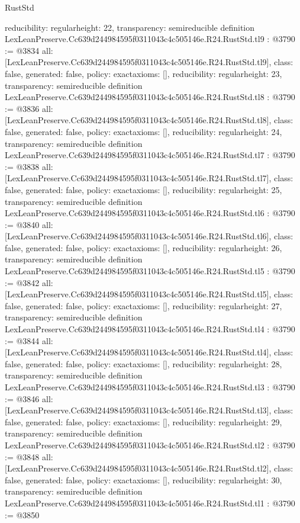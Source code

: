 \begin{lexlean}{RustStd}
\begin{coremodule}
{  reducibility: regular{height: 22},
  transparency: semireducible
}
definition LexLeanPreserve.Cc639d244984595f0311043c4c505146e.R24.RustStd.tl9 : @3790 := @3834 {
  all: [LexLeanPreserve.Cc639d244984595f0311043c4c505146e.R24.RustStd.tl9],
  class: false,
  generated: false,
  policy: exact{axioms: []},
  reducibility: regular{height: 23},
  transparency: semireducible
}
definition LexLeanPreserve.Cc639d244984595f0311043c4c505146e.R24.RustStd.tl8 : @3790 := @3836 {
  all: [LexLeanPreserve.Cc639d244984595f0311043c4c505146e.R24.RustStd.tl8],
  class: false,
  generated: false,
  policy: exact{axioms: []},
  reducibility: regular{height: 24},
  transparency: semireducible
}
definition LexLeanPreserve.Cc639d244984595f0311043c4c505146e.R24.RustStd.tl7 : @3790 := @3838 {
  all: [LexLeanPreserve.Cc639d244984595f0311043c4c505146e.R24.RustStd.tl7],
  class: false,
  generated: false,
  policy: exact{axioms: []},
  reducibility: regular{height: 25},
  transparency: semireducible
}
definition LexLeanPreserve.Cc639d244984595f0311043c4c505146e.R24.RustStd.tl6 : @3790 := @3840 {
  all: [LexLeanPreserve.Cc639d244984595f0311043c4c505146e.R24.RustStd.tl6],
  class: false,
  generated: false,
  policy: exact{axioms: []},
  reducibility: regular{height: 26},
  transparency: semireducible
}
definition LexLeanPreserve.Cc639d244984595f0311043c4c505146e.R24.RustStd.tl5 : @3790 := @3842 {
  all: [LexLeanPreserve.Cc639d244984595f0311043c4c505146e.R24.RustStd.tl5],
  class: false,
  generated: false,
  policy: exact{axioms: []},
  reducibility: regular{height: 27},
  transparency: semireducible
}
definition LexLeanPreserve.Cc639d244984595f0311043c4c505146e.R24.RustStd.tl4 : @3790 := @3844 {
  all: [LexLeanPreserve.Cc639d244984595f0311043c4c505146e.R24.RustStd.tl4],
  class: false,
  generated: false,
  policy: exact{axioms: []},
  reducibility: regular{height: 28},
  transparency: semireducible
}
definition LexLeanPreserve.Cc639d244984595f0311043c4c505146e.R24.RustStd.tl3 : @3790 := @3846 {
  all: [LexLeanPreserve.Cc639d244984595f0311043c4c505146e.R24.RustStd.tl3],
  class: false,
  generated: false,
  policy: exact{axioms: []},
  reducibility: regular{height: 29},
  transparency: semireducible
}
definition LexLeanPreserve.Cc639d244984595f0311043c4c505146e.R24.RustStd.tl2 : @3790 := @3848 {
  all: [LexLeanPreserve.Cc639d244984595f0311043c4c505146e.R24.RustStd.tl2],
  class: false,
  generated: false,
  policy: exact{axioms: []},
  reducibility: regular{height: 30},
  transparency: semireducible
}
definition LexLeanPreserve.Cc639d244984595f0311043c4c505146e.R24.RustStd.tl1 : @3790 := @3850 {
}
\end{coremodule}
\end{lexlean}
